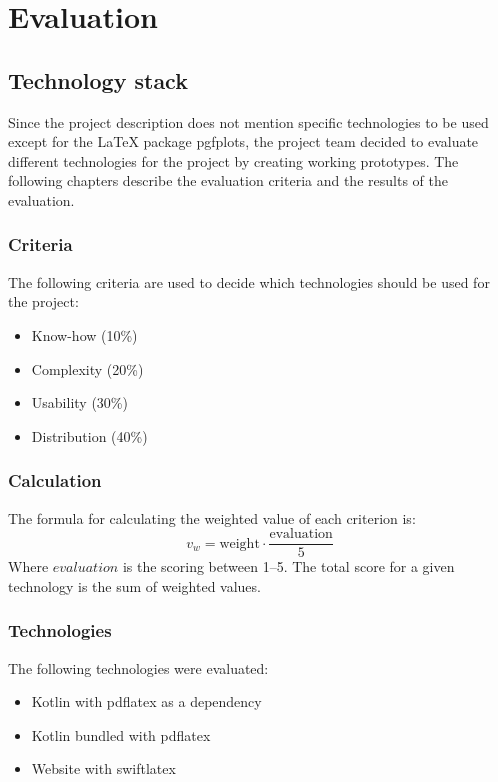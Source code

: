 \section{Evaluation}
\label{sec:evaluation}

\subsection{Technology stack}
\label{subsec:technology_stack}
Since the project description does not mention specific technologies to be used except for the LaTeX package pgfplots, 
the project team decided to evaluate different technologies for the project by creating working prototypes.
The following chapters describe the evaluation criteria and the results of the evaluation.

\subsubsection{Criteria}
The following criteria are used to decide which technologies should be used for the project:
\begin{itemize}
    \item Know-how (10\%)
    \item Complexity (20\%)
    \item Usability (30\%)
    \item Distribution (40\%)
\end{itemize}

\subsubsection{Calculation}
The formula for calculating the weighted value of each criterion is:
\[
v_w = \text{weight} \cdot \frac{\text{evaluation}}{5}
\]
Where $evaluation$ is the scoring between 1--5.
The total score for a given technology is the sum
of weighted values.

\subsubsection{Technologies}
The following technologies were evaluated:
\begin{itemize}
    \item Kotlin with pdflatex as a dependency
    \item Kotlin bundled with pdflatex
    \item Website with swiftlatex
\end{itemize}

